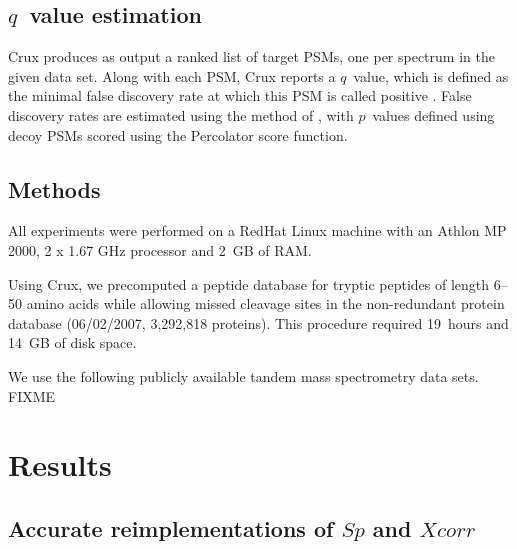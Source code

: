 \documentclass{bioinfo}
\renewcommand{\cite}{\citep}
\begin{document}
\subsection{$q$~value estimation}
\label{section:q-value}

Crux produces as output a ranked list of target PSMs, one per spectrum
in the given data set.  Along with each PSM, Crux reports a $q$~value,
which is defined as the minimal false discovery rate at which this PSM
is called positive \cite{storey:statistical}.  False discovery rates
are estimated using the method of \cite{benjamini:controlling}, with
$p$~values defined using decoy PSMs scored using the Percolator score
function.

\begin{methods}
\section{Methods}

All experiments were performed on a RedHat Linux machine with an
Athlon MP 2000, 2 x 1.67 GHz processor and 2~GB of RAM.

Using Crux, we precomputed a peptide database for tryptic peptides of
length 6--50 amino acids while allowing missed cleavage sites in the
non-redundant protein database (06/02/2007, 3,292,818 proteins). This
procedure required 19~hours and 14~GB of disk space.

We use the following publicly available tandem mass spectrometry data
sets.  FIXME

\end{methods}

\section{Results}

\subsection{Accurate reimplementations of $Sp$ and $Xcorr$}
\end{document}
